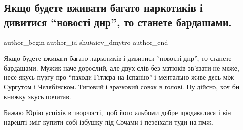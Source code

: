  
 
 
 
 
 
\subsection{Якщо будете вживати багато наркотиків і дивитися \enquote{новості днр}, то станете бардашами.}
\label{sec:26_11_2020.fb.shutaiev_dmytro.1.bardash}
\ifcmt
	author_begin
   author_id shutaiev_dmytro
	author_end
\fi

Якщо будете вживати багато наркотиків і дивитися \enquote{новості днр}, то станете
бардашами. Мужик наче дорослий, але двух слів без матюків зв'язати не може,
несе якусь пургу про \enquote{паходи Гітлєра на Іспанію} і ментально живе десь між
Сургутом і Чєлябінском. Типовий і зразковий совок в голові. Ну дійсно, хоч би
книжку якусь почитав. 

Бажаю Юрію успіхів в творчості, щоб його альбоми добре продавалися і він
нарешті зміг купити собі ізбушку під Сочами і переїхати туди на пмж.
